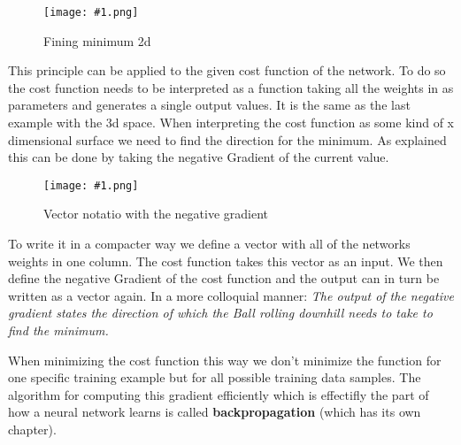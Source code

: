 \documentclass{article}
\newcommand{\img}[1]{
	\centering
	\texttt{[image: \#1.png]}
	\label{#1}
}
\begin{document}
\begin{figure}[!htbp]
\img{ai_16}
\caption{Fining minimum 2d}
\end{figure}

This principle can be applied to the given cost function of the network. To do so the cost function needs to be interpreted as a function taking all the weights in as parameters and generates a single output values. It is the same as the last example with the 3d space. When interpreting the cost function as some kind of x dimensional surface we need to find the direction for the minimum. As explained this can be done by taking the negative Gradient of the current value. 

\clearpage 

\begin{figure}[!htbp]
\img{ai_17}
\caption{Vector notatio with the negative gradient}
\end{figure}

To write it in a compacter way we define a vector with all of the networks weights in one column. The cost function takes this vector as an input. We then define the negative Gradient of the cost function and the output can in turn be written as a vector again. In a more colloquial manner: \textit{The output of the negative gradient states the direction of which the Ball rolling downhill needs to take to find the minimum.}

When minimizing the cost function this way we don't minimize the function for one specific training example but for all possible training data samples. The algorithm for computing this gradient efficiently which is effectifly the part of how a neural network learns is called \textbf{backpropagation} (which has its own chapter). 
\end{document}
